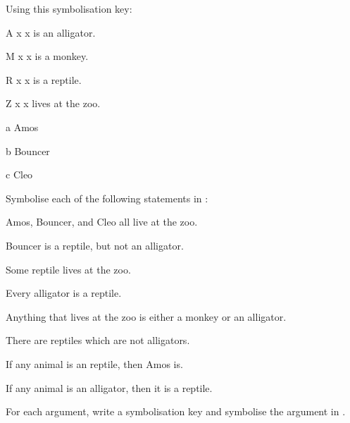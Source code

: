 \documentclass[PHIL101-Textbook.tex]{subfiles}
\begin{document}
\noindent\solutions
\problempart\label{pr.plalligators}
Using this symbolisation key:
\begin{ekey}
\item[\atom A x ] x is an alligator.
\item[\atom M x ] x is a monkey.
\item[\atom R x ] x is a reptile.
\item[\atom Z x ] x lives at the zoo.
\item[a] Amos
\item[b] Bouncer
\item[c] Cleo
\end{ekey}
Symbolise each of the following statements in \pl:
\begin{earg}
\item Amos, Bouncer, and Cleo all live at the zoo. 
\item Bouncer is a reptile, but not an alligator. 
\item Some reptile lives at the zoo. 
\item Every alligator is a reptile. 
\item Anything that lives at the zoo is either a monkey or an alligator. 
\item There are reptiles which are not alligators.
\item If any animal is an reptile, then Amos is.
\item If any animal is an alligator, then it is a reptile.
\end{earg}


\pagebreak
\noindent\problempart
\label{pr.arguments}
For each argument, write a symbolisation key and symbolise the argument in \pl.
\end{document}
